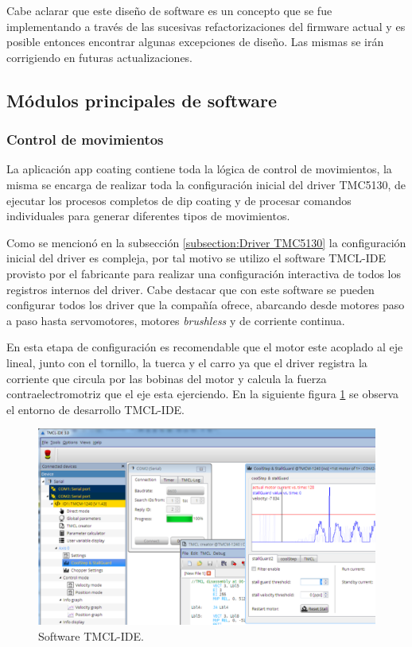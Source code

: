 Cabe aclarar que este diseño de software es un concepto que se fue implementando a través de las sucesivas refactorizaciones del firmware actual y es posible entonces encontrar algunas excepciones de diseño. Las mismas se irán corrigiendo en futuras actualizaciones.


\subsection{Módulos principales de software}
\label{sec:modulos principales}
\subsubsection{Control de movimientos}

La aplicación app coating contiene toda la lógica de control de movimientos, la misma se encarga de realizar toda la configuración inicial del driver TMC5130, de ejecutar los procesos completos de dip coating y de procesar comandos individuales para generar diferentes tipos de movimientos. 

Como se mencionó en la subsección \ref{subsection:Driver TMC5130} la configuración inicial del driver es compleja, por tal motivo se utilizo el software  TMCL-IDE provisto por el fabricante para realizar una configuración interactiva de todos los registros internos del driver. Cabe destacar que con este software se pueden configurar todos los driver que la compañía ofrece, abarcando desde motores paso a paso hasta  servomotores, motores \textit{brushless} y de corriente continua. 

En esta etapa de configuración es recomendable que el motor este acoplado al eje lineal, junto con el tornillo, la tuerca y el carro ya que el driver registra la corriente que circula por las bobinas del motor y calcula la fuerza contraelectromotriz que el eje esta ejerciendo. 
En la siguiente figura \ref{fig:tmcl_ide} se observa el entorno de desarrollo TMCL-IDE.  

\begin{figure}[h!t]
	\centering
	\includegraphics[width=1\textwidth]{./Figures/tmcl_ide_1.png}
	\caption{Software TMCL-IDE.}
	\label{fig:tmcl_ide}
\end{figure}


